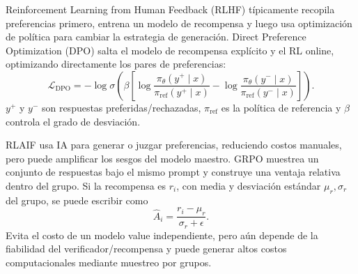 Reinforcement Learning from Human Feedback (RLHF) típicamente recopila preferencias primero, entrena un modelo de recompensa y luego usa optimización de política para cambiar la estrategia de generación. Direct Preference Optimization (DPO) salta el modelo de recompensa explícito y el RL online, optimizando directamente los pares de preferencias:
\[
\mathcal{L}_{\mathrm{DPO}}
=-\log\sigma\!\left(\beta\left[
\log\frac{\pi_{\theta}(y^+\mid x)}{\pi_{\mathrm{ref}}(y^+\mid x)}
-\log\frac{\pi_{\theta}(y^-\mid x)}{\pi_{\mathrm{ref}}(y^-\mid x)}
\right]\right).
\]
$y^+$ y $y^-$ son respuestas preferidas/rechazadas, $\pi_{\mathrm{ref}}$ es la política de referencia y $\beta$ controla el grado de desviación.



RLAIF usa IA para generar o juzgar preferencias, reduciendo costos manuales, pero puede amplificar los sesgos del modelo maestro. GRPO muestrea un conjunto de respuestas bajo el mismo prompt y construye una ventaja relativa dentro del grupo. Si la recompensa es $r_i$, con media y desviación estándar $\mu_r,\sigma_r$ del grupo, se puede escribir como
\[
\hat{A}_i=\frac{r_i-\mu_r}{\sigma_r+\epsilon}.
\]
Evita el costo de un modelo value independiente, pero aún depende de la fiabilidad del verificador/recompensa y puede generar altos costos computacionales mediante muestreo por grupos.



